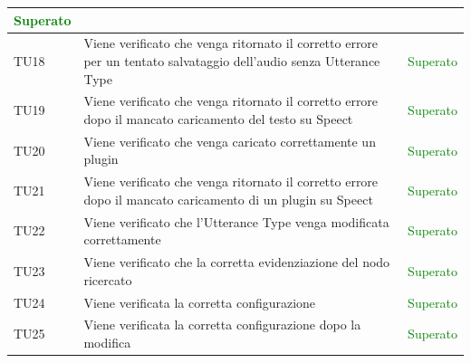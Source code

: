 \documentclass[openany,12pt,a4paper]{report}
\begin{document}
\begin{longtable}[c]{| p{2.5cm} |p{8cm} | p{2.5cm} |}
	\newline \textcolor{green}{Superato}
	\\[1em]
	\hline
	\newline TU18&
	\newline Viene verificato che venga ritornato il corretto errore per un tentato salvataggio dell'audio senza Utterance Type&
	\newline \textcolor{green}{Superato}
	\\[1em]
	\hline
	\newline TU19&
	\newline Viene verificato che venga ritornato il corretto errore dopo il mancato caricamento del testo su Speect&
	\newline \textcolor{green}{Superato}
	\\[1em]
	\hline
	\newline TU20&
	\newline Viene verificato che venga caricato correttamente un plugin&
	\newline \textcolor{green}{Superato}
	\\[1em]
	\hline
	\newline TU21&
	\newline Viene verificato che venga ritornato il corretto errore dopo il mancato caricamento di un plugin su Speect&
	\newline \textcolor{green}{Superato}
	\\[1em]
	\hline
	\newline TU22&
	\newline Viene verificato che l'Utterance Type venga modificata correttamente&
	\newline \textcolor{green}{Superato}
	\\[1em]
	\hline
	\newline TU23&
	\newline Viene verificato che la corretta evidenziazione del nodo ricercato&
	\newline \textcolor{green}{Superato}
	\\[1em]
	\hline
	\newline TU24&
	\newline Viene verificata la corretta configurazione&
	\newline \textcolor{green}{Superato}
	\\[1em]
	\hline
	\newline TU25&
	\newline Viene verificata la corretta configurazione dopo la modifica&
	\newline \textcolor{green}{Superato}
	\\[1em]
	\hline
\end{longtable}
\end{document}
